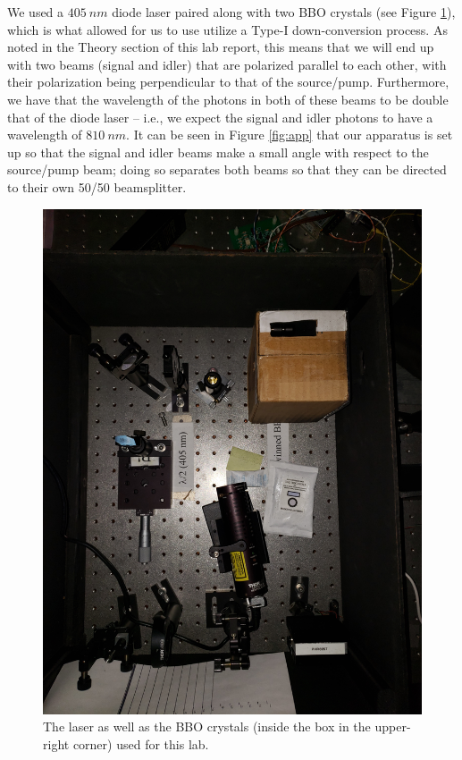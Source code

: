 \documentclass[twocolumn,amsmath,amssymb,pra]{revtex4-2}
\begin{document}
We used a $405 \ \si{ nm }$ diode laser paired along with two BBO crystals (see Figure \ref{fig:laser}), which is what allowed for us to use utilize a Type-I down-conversion process. As noted in the Theory section of this lab report, this means that we will end up with two beams (signal and idler) that are polarized parallel to each other, with their polarization being perpendicular to that of the source/pump. Furthermore, we have that the wavelength of the photons in both of these beams to be double that of the diode laser -- i.e., we expect the signal and idler photons to have a wavelength of $810 \ \si{nm}$. It can be seen in Figure \ref{fig:app} that our apparatus is set up so that the signal and idler beams make a small angle with respect to the source/pump beam; doing so separates both beams so that they can be directed to their own 50/50 beamsplitter.
\begin{figure}[H]
    \centering
    \includegraphics[width = 0.95\linewidth]{laser.jpg}
    \caption{The laser as well as the BBO crystals (inside the box in the upper-right corner) used for this lab.}
    \label{fig:laser}
\end{figure}
\end{document}
